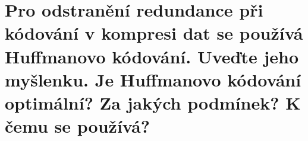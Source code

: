 \section{Pro odstranění redundance při kódování v kompresi dat se používá Huffmanovo kódování. Uveďte jeho myšlenku. Je 
Huffmanovo kódování optimální? Za jakých podmínek? K čemu se používá?}